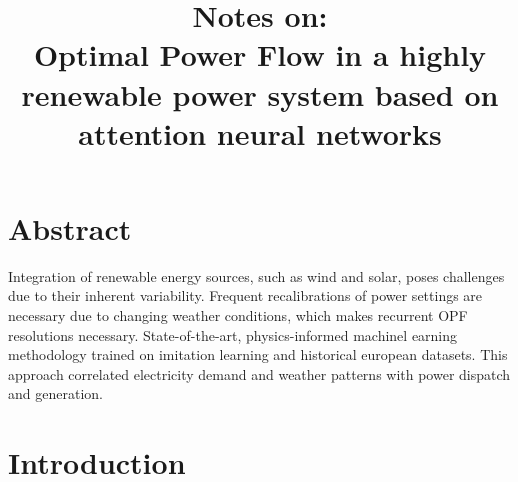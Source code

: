 \documentclass{article}
\title{\textbf{Notes on:}\\ Optimal Power Flow in a highly renewable power
system based on attention neural networks}
\author{}
\begin{document}
\maketitle{}

\section{Abstract}
Integration of renewable energy sources, such as wind and solar, poses
challenges due to their inherent variability. Frequent recalibrations of power
settings are necessary due to changing weather conditions, which makes
recurrent OPF resolutions necessary. State-of-the-art, physics-informed
machinel earning methodology trained on imitation learning and historical
european datasets. This approach correlated electricity demand and weather
patterns with power dispatch and generation.

\section{Introduction}
    
\end{document}
